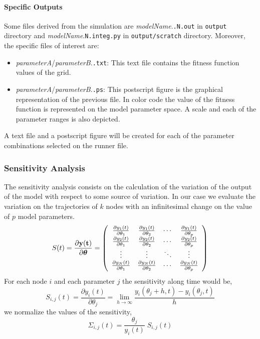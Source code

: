 \documentclass[a4paper, 11pt]{article}
\begin{document}
\paragraph{Specific Outputs}
Some files derived from the simulation are \textit{modelName}.\texttt{.N.out} in \texttt{output} directory and \textit{modelName}.\texttt{N.integ.py} in \texttt{output/scratch} directory.
Moreover, the specific files of interest are:
\begin{itemize}
  \item \textit{parameterA}/\textit{parameterB}.\texttt{.txt}: 
    This text file contains the fitness function values of the grid.
  \item \textit{parameterA}/\textit{parameterB}.\texttt{.ps}:
    This postscript figure is the graphical representation of the previous file.
    In color code the value of the fitness function is represented on the model parameter space.
    A scale and each of the parameter ranges is also depicted.
\end{itemize}
A text file and a postscript figure will be created for each of the parameter combinations selected on the runner file.
\subsubsection{Sensitivity Analysis} \label{sensitivityAnalysis}
The sensitivity analysis consists on the calculation of the variation of the output of the model with respect to some source of variation.
In our case we evaluate the variation on the trajectories of $k$ nodes with an infinitesimal change on the value of $p$ model parameters. 
\begin{equation}
  S(t) = \frac{\partial \bf{y}(t)}{\partial \bm{\theta}} = 
  \left(
    \begin{array}{cccc}
      \frac{\partial y_1(t)}{\partial \theta_1} & \frac{\partial y_1(t)}{\partial \theta_2} & \cdots & \frac{\partial y_1(t)}{\partial \theta_p} \\
      \frac{\partial y_2(t)}{\partial \theta_1} & \frac{\partial y_2(t)}{\partial \theta_2} & \cdots & \frac{\partial y_2(t)}{\partial \theta_p} \\
      \vdots & \vdots & \ddots & \vdots \\
      \frac{\partial y_N(t)}{\partial \theta_1} & \frac{\partial y_N(t)}{\partial \theta_2} & \cdots & \frac{\partial y_N(t)}{\partial \theta_p} \\
    \end{array}
  \right)
\end{equation}
For each node $i$ and each parameter $j$ the sensitivity along time would be,
\begin{equation}
  S_{i,j}(t) = \frac{\partial y_i(t)}{\partial \theta_j} = \lim_{h\to\infty}\frac{y_i(\theta_j+h, t) - y_i(\theta_j, t)}{h}
\end{equation}
we normalize the values of the sensitivity, 
\begin{equation} \label{normalisedSensitivity}
  \Sigma_{i,j}(t) = \frac{\theta_j}{y_i(t)}\;S_{i,j}(t)
\end{equation}
\end{document}
